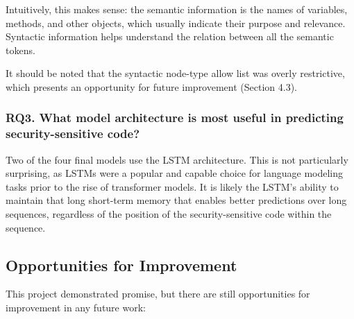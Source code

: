 \documentclass[11pt]{article}
\begin{document}
Intuitively, this makes sense: the semantic information is the names of
variables, methods, and other objects, which usually indicate their
purpose and relevance. Syntactic information helps understand the
relation between all the semantic tokens.

It should be noted that the syntactic node-type allow list was overly
restrictive, which presents an opportunity for future improvement (Section 4.3).

\subsubsection*{RQ3. What model architecture is most useful in predicting security-sensitive code?}\label{rq3.-what-model-architecture-is-most-useful-in-predicting-security-sensitive-code-1}

Two of the four final models use the LSTM architecture. This is not
particularly surprising, as LSTMs were a popular and capable choice
for language modeling tasks prior to the rise of transformer models. It is likely the LSTM's ability to maintain that long
short-term memory that enables better predictions over long sequences,
regardless of the position of the security-sensitive code within the
sequence.

\subsection{Opportunities for Improvement}\label{next-steps-opportunities-for-improvement}

This project demonstrated promise, but there are still opportunities for improvement in any future work:
\end{document}

